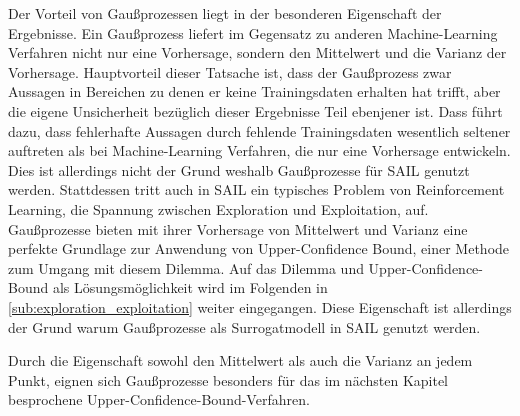 Der Vorteil von Gaußprozessen liegt in der besonderen Eigenschaft der Ergebnisse.
Ein Gaußprozess liefert im Gegensatz zu anderen Machine-Learning Verfahren nicht nur eine Vorhersage, sondern den Mittelwert und die Varianz der Vorhersage.
Hauptvorteil dieser Tatsache ist, dass der Gaußprozess zwar Aussagen in Bereichen zu denen er keine Trainingsdaten erhalten hat trifft, aber die eigene Unsicherheit bezüglich dieser Ergebnisse Teil ebenjener ist.
Dass führt dazu, dass fehlerhafte Aussagen durch fehlende Trainingsdaten wesentlich seltener auftreten als bei Machine-Learning Verfahren, die nur eine Vorhersage entwickeln.
Dies ist allerdings nicht der Grund weshalb Gaußprozesse für SAIL genutzt werden.
Stattdessen tritt auch in SAIL ein typisches Problem von Reinforcement Learning, die Spannung zwischen Exploration und Exploitation, auf.
Gaußprozesse bieten mit ihrer Vorhersage von Mittelwert und Varianz eine perfekte Grundlage zur Anwendung von Upper-Confidence Bound, einer Methode zum Umgang mit diesem Dilemma.
Auf das Dilemma und Upper-Confidence-Bound als Lösungsmöglichkeit wird im Folgenden in \ref{sub:exploration_exploitation} weiter eingegangen.
Diese Eigenschaft ist allerdings der Grund warum Gaußprozesse als Surrogatmodell in SAIL genutzt werden.

%





Durch die Eigenschaft sowohl den Mittelwert als auch die Varianz an jedem Punkt, eignen sich Gaußprozesse besonders für das im nächsten Kapitel besprochene Upper-Confidence-Bound-Verfahren.

